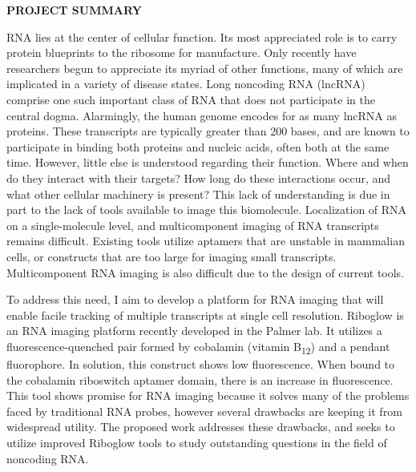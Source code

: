 \begin{center}
{\bf PROJECT SUMMARY}
\end{center}

RNA lies at the center of cellular function. Its most appreciated role is to carry protein blueprints to the ribosome for manufacture.
Only recently have researchers begun to appreciate its myriad of other functions, many of which are implicated in a variety of disease states.
Long noncoding RNA (lncRNA) comprise one such important class of RNA that does not participate in the central dogma. Alarmingly, the human genome encodes for as many lncRNA as proteins.
These transcripts are typically greater than 200 bases, and are known to participate in binding both proteins and nucleic acids, often both at the same time.
However, little else is understood regarding their function.
Where and when do they interact with their targets?
How long do these interactions occur, and what other cellular machinery is present?
This lack of understanding is due in part to the lack of tools available to image this biomolecule. Localization of RNA on a single-molecule level, and multicomponent imaging of RNA transcripts remains difficult. Existing tools utilize aptamers that are unstable in mammalian cells, or constructs that are too large for imaging small transcripts. Multicomponent RNA imaging is also difficult due to the design of current tools.

To address this need, I aim to develop a platform for RNA imaging that will enable facile tracking of multiple transcripts at single cell resolution. Riboglow is an RNA imaging platform recently developed in the Palmer lab. It utilizes a fluorescence-quenched pair formed by cobalamin (vitamin B\textsubscript{12}) and a pendant fluorophore. In solution, this construct shows low fluorescence. When bound to the cobalamin riboswitch aptamer domain, there is an increase in fluorescence. This tool shows promise for RNA imaging because it solves many of the problems faced by traditional RNA probes, however several drawbacks are keeping it from widespread utility. The proposed work addresses these drawbacks, and seeks to utilize improved Riboglow tools to study outstanding questions in the field of noncoding RNA.

